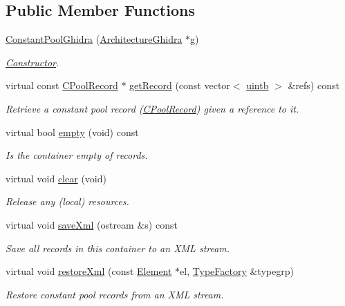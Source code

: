 \subsection*{Public Member Functions}
\begin{DoxyCompactItemize}
\item 
\mbox{\hyperlink{class_constant_pool_ghidra_a866684d5efdad76400fee446d0f5ae11}{Constant\+Pool\+Ghidra}} (\mbox{\hyperlink{class_architecture_ghidra}{Architecture\+Ghidra}} $\ast$g)
\begin{DoxyCompactList}\small\item\em \mbox{\hyperlink{class_constructor}{Constructor}}. \end{DoxyCompactList}\item 
virtual const \mbox{\hyperlink{class_c_pool_record}{C\+Pool\+Record}} $\ast$ \mbox{\hyperlink{class_constant_pool_ghidra_ac4520027014d9d9c6cd6e12b17488f02}{get\+Record}} (const vector$<$ \mbox{\hyperlink{types_8h_a2db313c5d32a12b01d26ac9b3bca178f}{uintb}} $>$ \&refs) const
\begin{DoxyCompactList}\small\item\em Retrieve a constant pool record (\mbox{\hyperlink{class_c_pool_record}{C\+Pool\+Record}}) given a {\itshape reference} to it. \end{DoxyCompactList}\item 
virtual bool \mbox{\hyperlink{class_constant_pool_ghidra_a224351241fabcf4ebb2a0d2701b63e40}{empty}} (void) const
\begin{DoxyCompactList}\small\item\em Is the container empty of records. \end{DoxyCompactList}\item 
virtual void \mbox{\hyperlink{class_constant_pool_ghidra_ac0b80eac8d8d3a5abf9db557ae9336fc}{clear}} (void)
\begin{DoxyCompactList}\small\item\em Release any (local) resources. \end{DoxyCompactList}\item 
virtual void \mbox{\hyperlink{class_constant_pool_ghidra_a9be92093e47d8158d6df6ca7c6524f80}{save\+Xml}} (ostream \&s) const
\begin{DoxyCompactList}\small\item\em Save all records in this container to an X\+ML stream. \end{DoxyCompactList}\item 
virtual void \mbox{\hyperlink{class_constant_pool_ghidra_a4054279a4d397dda4a1fb33005c8e445}{restore\+Xml}} (const \mbox{\hyperlink{class_element}{Element}} $\ast$el, \mbox{\hyperlink{class_type_factory}{Type\+Factory}} \&typegrp)
\begin{DoxyCompactList}\small\item\em Restore constant pool records from an X\+ML stream. \end{DoxyCompactList}\end{DoxyCompactItemize}


